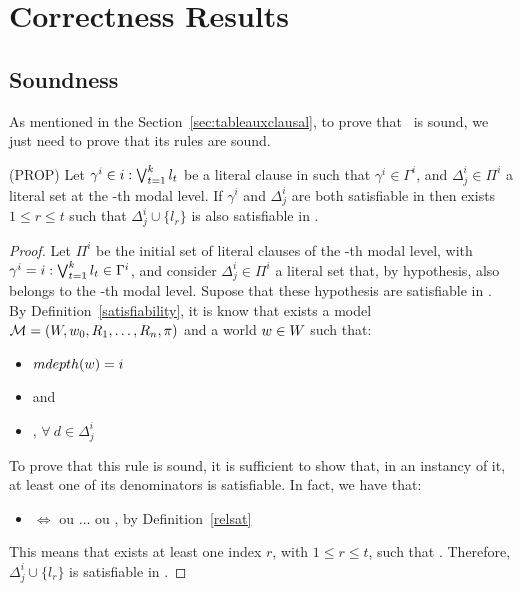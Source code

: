 \section{Correctness Results}
\label{sec:correctnessresults}

\subsection{Soundness}
\label{sec:sound}

As mentioned in the Section~\ref{sec:tableauxclausal}, to prove that \ckn~is
sound, we just need to prove that its rules are sound.

\begin{lemma}{(PROP)} Let $\gamma^i \in i: \bigvee^{k}_{t = 1}l_{t}$ be a literal clause in
     such that $\gamma^i \in \Gamma^i$, and $\Delta^i_j \in \Pi^i$ a
    literal set at the \ml-th modal level. If $\gamma^i$ and $\Delta^i_j$ are
    both satisfiable in  then exists $1 \leq r \leq t$ such that
    $\Delta^i_j \cup \{l_r\}$ is also satisfiable in .
\end{lemma}
\begin{proof}
   Let $\Pi^i$ be the initial set of literal clauses of the \ml-th modal level,
   with $\gamma^i = i: \bigvee^{k}_{t = 1}l_{t} \in \Gamma^i$, and consider $\Delta^i_j \in
   \Pi^i$ a literal set that, by hypothesis, also belongs to the \ml-th modal
   level. Supose that these hypothesis are satisfiable in . By
   Definition~\ref{satisfiability}, it is know that exists a model $\mathcal{M} = (W,
   w_0, R_1, \ldots, R_n, \pi)$ and a world $w \in W$ such that:
   \begin{itemize}
       \item $mdepth(w) = i$ 
       \item {} and
       \item {}, $\forall~d \in \Delta^i_j$
   \end{itemize}
   To prove that this rule is sound, it is sufficient to show that, in an
   instancy of it, at least one of its denominators is satisfiable. In fact, we
   have that:
   \begin{itemize}
       \item {} $\iff$
            ou $\ldots$ ou , by
           Definition~\ref{relsat}
   \end{itemize}
   This means that exists at least one index $r$, with $1 \leq r \leq t$, such
   that . Therefore, $\Delta^i_j \cup \{l_r\}$ is
   satisfiable in .
\end{proof}

